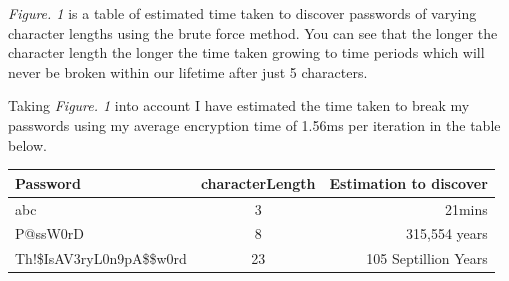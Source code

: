 \documentclass[a4paper, twoside, 11pt]{article}
\begin{document}
 \textit{Figure. 1} is a table of estimated time taken to discover passwords of varying character lengths using the brute force method. 
 You can see that the longer the character length the longer the time taken growing to time periods which will never be broken within
  our lifetime after just 5 characters. 

  Taking \textit{Figure. 1} into account I have estimated the time taken to break my passwords using my average encryption time of 1.56ms per iteration in the table below.

  \begin{center}
	\begin{tabular}{ |l|c|r| } 
	 \hline
	 Password & characterLength & Estimation to discover \\
	 \hline
	 abc & 3 & 21mins \\
	 P@ssW0rD & 8 & 315,554 years \\
	 Th!\$IsAV3ryL0n9pA\$\$w0rd & 23 & 105 Septillion Years \\
	 \hline
	\end{tabular}
\end{center}

  \newpage
\end{document}

